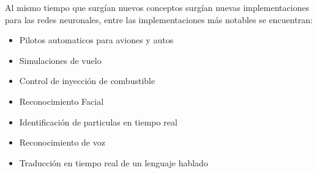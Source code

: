 \documentclass{article}
\begin{document}
Al mismo tiempo que surgían nuevos conceptos surgían nuevas implementaciones para las redes neuronales, entre las implementaciones más notables se encuentran:
\begin{itemize}
	\item Pilotos automaticos para aviones y autos
	\item Simulaciones de vuelo
	\item Control de inyección de combustible
	\item Reconocimiento Facial
	\item Identificación de particulas en tiempo real
	\item Reconocimiento de voz
	\item Traducción en tiempo real de un lenguaje hablado
\end{itemize}
\end{document}
